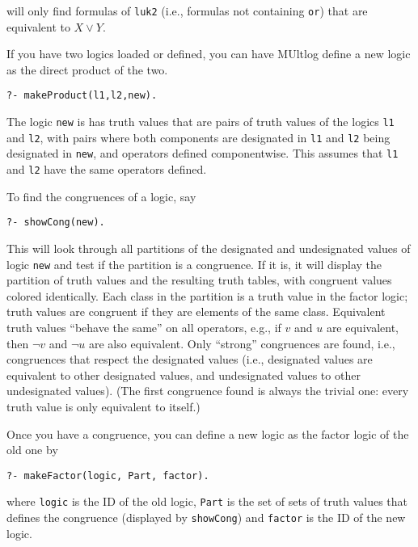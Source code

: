 \documentclass[
]{article}
\newcommand{\passthrough}[1]{#1}
\begin{document}
will only find formulas of \passthrough{\lstinline!luk2!} (i.e.,
formulas not containing \passthrough{\lstinline!or!}) that are
equivalent to \(X \lor Y\).

If you have two logics loaded or defined, you can have MUltlog define a
new logic as the direct product of the two.

\begin{lstlisting}
?- makeProduct(l1,l2,new).
\end{lstlisting}

The logic \passthrough{\lstinline!new!} is has truth values that are
pairs of truth values of the logics \passthrough{\lstinline!l1!} and
\passthrough{\lstinline!l2!}, with pairs where both components are
designated in \passthrough{\lstinline!l1!} and
\passthrough{\lstinline!l2!} being designated in
\passthrough{\lstinline!new!}, and operators defined componentwise. This
assumes that \passthrough{\lstinline!l1!} and
\passthrough{\lstinline!l2!} have the same operators defined.

To find the congruences of a logic, say

\begin{lstlisting}
?- showCong(new).
\end{lstlisting}

This will look through all partitions of the designated and undesignated
values of logic \passthrough{\lstinline!new!} and test if the partition
is a congruence. If it is, it will display the partition of truth values
and the resulting truth tables, with congruent values colored
identically. Each class in the partition is a truth value in the factor
logic; truth values are congruent if they are elements of the same
class. Equivalent truth values ``behave the same'' on all operators,
e.g., if \(v\) and \(u\) are equivalent, then \(\lnot v\) and
\(\lnot u\) are also equivalent. Only ``strong'' congruences are found,
i.e., congruences that respect the designated values (i.e., designated
values are equivalent to other designated values, and undesignated
values to other undesignated values). (The first congruence found is
always the trivial one: every truth value is only equivalent to itself.)

Once you have a congruence, you can define a new logic as the factor
logic of the old one by

\begin{lstlisting}
?- makeFactor(logic, Part, factor).
\end{lstlisting}

where \passthrough{\lstinline!logic!} is the ID of the old logic,
\passthrough{\lstinline!Part!} is the set of sets of truth values that
defines the congruence (displayed by \passthrough{\lstinline!showCong!})
and \passthrough{\lstinline!factor!} is the ID of the new logic.
\end{document}
